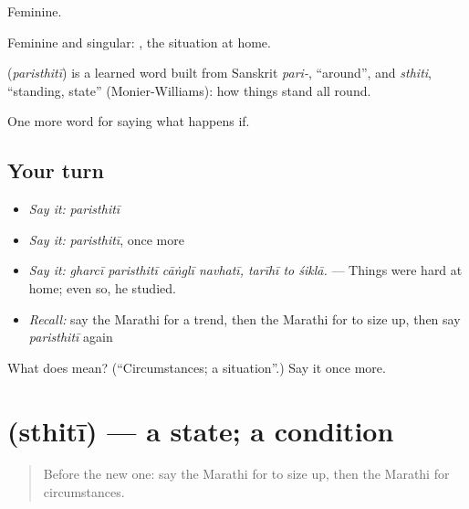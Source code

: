Feminine.

Feminine and singular:  , the situation at home.

\begin{cousinweb}
\textbf{} (\emph{paristhitī}) is a learned word built from Sanskrit \emph{pari-}, \textquotedblleft{}around\textquotedblright{}, and \emph{sthiti}, \textquotedblleft{}standing, state\textquotedblright{} (Monier-Williams): how things stand all round.
\end{cousinweb}

\begin{grammarlens}[title={What you've built}]
One more word for saying what happens if.
\end{grammarlens}

\subsection*{Your turn}
\begin{itemize}
\raggedright
  \item \emph{Say it:} \emph{paristhitī}
  \item \emph{Say it:} \emph{paristhitī}, once more
  \item \emph{Say it:} \emph{gharcī paristhitī cāṅglī navhatī, tarīhī to śiklā.} — Things were hard at home; even so, he studied.
  \item \emph{Recall:} say the Marathi for a trend, then the Marathi for to size up, then say \emph{paristhitī} again
\end{itemize}

\begin{tcolorbox}[breakable,colback=teal!4,colframe=teal!35!black,title={Before you move on}]
What does  mean? (\textquotedblleft{}Circumstances; a situation\textquotedblright{}.) Say it once more.
\end{tcolorbox}
\section[\texorpdfstring{\mr{स्थिती} (sthitī)}{स्थिती (sthitī)}]{ (sthitī) — a state; a condition}

\label{lesson:MR-C384-sthiti}



\begin{quote}
Before the new one: say the Marathi for to size up, then the Marathi for circumstances.
\end{quote}

